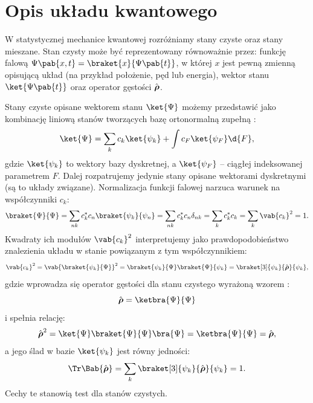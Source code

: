 
\section{Opis układu kwantowego}
W statystycznej mechanice kwantowej rozróżniamy stany czyste oraz stany mieszane. Stan czysty może być reprezentowany równoważnie przez: funkcję falową \(\Psi\pab{x,t} = \braket{x}{\Psi\pab{t}}\), w której \(x\) jest pewną zmienną opisującą układ (na przykład położenie, pęd lub energia), wektor stanu \(\ket{\Psi\pab{t}}\) oraz operator gęstości \(\vu{\rho}\).

Stany czyste opisane wektorem stanu \(\ket{\Psi}\) możemy przedstawić jako kombinację liniową stanów tworzących bazę ortonormalną zupełną \cite{davydov_mechanika_kwantowa}:
\begin{equation*}
	\ket{\Psi} = \sum_{k} c_{k} \ket{\psi_{k}} + \int c_F \ket{\psi_F} \d{F},
\end{equation*}
gdzie \(\ket{\psi_k}\) to wektory bazy dyskretnej, a \(\ket{\psi_F}\) --  ciągłej indeksowanej parametrem \(F\). Dalej rozpatrujemy jedynie stany opisane wektorami dyskretnymi (są to układy związane). Normalizacja funkcji falowej narzuca warunek na współczynniki \(c_k\):
\begin{equation*}
	\braket{\Psi}{\Psi} =
	\sum_{nk} c_k^* c_n \braket{\psi_k}{\psi_n} =
	\sum_{nk} c_k^* c_n \delta_{nk} =
	\sum_{k} c_k^* c_k =
	\sum_{k} \vab{c_k}^2 = 1.
\end{equation*}
Kwadraty ich modułów \(\vab{c_k}^2\) interpretujemy jako prawdopodobieństwo znalezienia układu w stanie powiązanym z tym współczynnikiem:
\begin{equation*}
	\vab{c_k}^2 = \vab{\braket{\psi_k}{\Psi}}^2 = \braket{\psi_k}{\Psi}\braket{\Psi}{\psi_k} = \braket[3]{\psi_k}{\vu{\rho}}{\psi_k},
\end{equation*}
gdzie wprowadza się operator gęstości dla stanu czystego wyrażoną wzorem \cite{townsend_a_modern_approach_to_quantum_mechanics}:
\begin{equation}
	\vu{\rho} = \ketbra{\Psi}{\Psi}
\end{equation}
i spełnia relację:
\begin{equation}\label{eq:projektor_operator_gestosci}
	\vu{\rho}^2 = \ket{\Psi}\braket{\Psi}{\Psi}\bra{\Psi} = \ketbra{\Psi}{\Psi} = \vu{\rho},
\end{equation}
a jego ślad w bazie \(\ket{\psi_k}\) jest równy jedności:
\begin{equation}
	\Tr\Bab{\vu{\rho}} = \sum_k \braket[3]{\psi_k}{\vu{\rho}}{\psi_k} = 1.
\end{equation}
Cechy te stanowią test dla stanów czystych.

